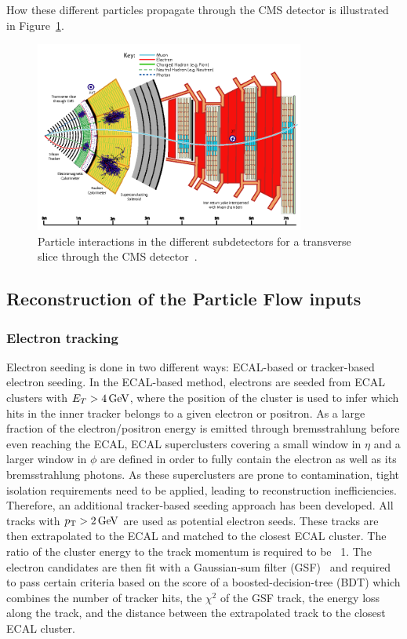 How these different particles propagate through the CMS detector is illustrated in Figure~\ref{fig:objreco:PF}.

\begin{figure}[h] 
    \centering
    \includegraphics[width=0.79\textwidth]{figures/event_reconstruction/PF.png}
    \caption{Particle interactions in the different subdetectors for a transverse slice through the CMS detector~\cite{1748-0221-12-10-P10003}.}
    \label{fig:objreco:PF}
\end{figure} 

\subsection{Reconstruction of the Particle Flow inputs}

\subsubsection{Electron tracking}
\label{subsub:objreco:electrontracking}
Electron seeding is done in two different ways: ECAL-based  or tracker-based electron seeding. In the ECAL-based method, electrons are seeded from  ECAL clusters with $E_T > 4 \,\text{Ge\hspace{-.08em}V}$, where the position of the cluster is used to infer which hits in the inner tracker belongs to a given electron or positron. As a large fraction of the electron/positron energy is emitted through bremsstrahlung before even reaching the ECAL, ECAL superclusters covering a small window in $\eta$ and a larger window in $\phi$ are defined in order to fully contain the electron as well as its bremsstrahlung photons. As these superclusters are prone to contamination, tight isolation requirements need to be applied, leading to reconstruction inefficiencies. Therefore, an additional tracker-based seeding approach has been developed. All tracks with $p_{\mathrm{T}}>2\,\text{Ge\hspace{-.08em}V}$ are used as potential electron seeds. These tracks are then extrapolated to the ECAL and matched to the closest ECAL cluster. The ratio of the cluster energy to the track
momentum is required to be ~1. The electron candidates are then fit with a Gaussian-sum filter (GSF)~\cite{0954-3899-31-9-N01} and required to pass certain criteria based on the score of a boosted-decision-tree (BDT) which combines the number of tracker hits, the $\chi^2$ of the GSF track, the energy loss along the  track, and the distance between the extrapolated track to the closest ECAL cluster.

